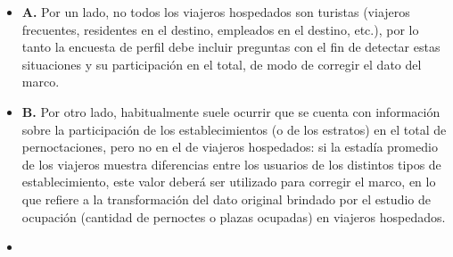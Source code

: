 \documentclass[
]{book}
\begin{document}
\begin{itemize}
\item
  \textbf{A.} Por un lado, no todos los viajeros hospedados son turistas (viajeros frecuentes, residentes en el destino, empleados en el destino, etc.), por lo tanto la encuesta de perfil debe incluir preguntas con el fin de detectar estas situaciones y su participación en el total, de modo de corregir el dato del marco.
\item
  \textbf{B.} Por otro lado, habitualmente suele ocurrir que se cuenta con información sobre la participación de los establecimientos (o de los estratos) en el total de pernoctaciones, pero no en el de viajeros hospedados: si la estadía promedio de los viajeros muestra diferencias entre los usuarios de los distintos tipos de establecimiento, este valor deberá ser utilizado para corregir el marco, en lo que refiere a la transformación del dato original brindado por el estudio de ocupación (cantidad de pernoctes o plazas ocupadas) en viajeros hospedados.
\item

\end{itemize}
\end{document}
